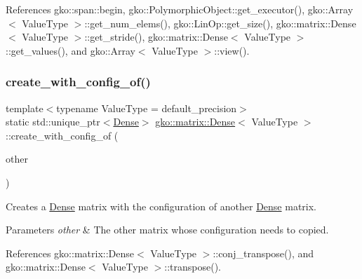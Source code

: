 References gko\+::span\+::begin, gko\+::\+Polymorphic\+Object\+::get\+\_\+executor(), gko\+::\+Array$<$ Value\+Type $>$\+::get\+\_\+num\+\_\+elems(), gko\+::\+Lin\+Op\+::get\+\_\+size(), gko\+::matrix\+::\+Dense$<$ Value\+Type $>$\+::get\+\_\+stride(), gko\+::matrix\+::\+Dense$<$ Value\+Type $>$\+::get\+\_\+values(), and gko\+::\+Array$<$ Value\+Type $>$\+::view().

\mbox{\label{classgko_1_1matrix_1_1Dense_a4c2089b9e1f7a99a32488a4964e832db}} 
\subsubsection{\texorpdfstring{create\+\_\+with\+\_\+config\+\_\+of()}{create\_with\_config\_of()}}
{\footnotesize\ttfamily template$<$typename Value\+Type = default\+\_\+precision$>$ \\
static std\+::unique\+\_\+ptr$<$\hyperlink{classgko_1_1matrix_1_1Dense}{Dense}$>$ \hyperlink{classgko_1_1matrix_1_1Dense}{gko\+::matrix\+::\+Dense}$<$ Value\+Type $>$\+::create\+\_\+with\+\_\+config\+\_\+of (\begin{DoxyParamCaption}\item[{const \hyperlink{classgko_1_1matrix_1_1Dense}{Dense}$<$ Value\+Type $>$ $\ast$}]{other }\end{DoxyParamCaption})\hspace{0.3cm}{\ttfamily [static]}}



Creates a \hyperlink{classgko_1_1matrix_1_1Dense}{Dense} matrix with the configuration of another \hyperlink{classgko_1_1matrix_1_1Dense}{Dense} matrix. 


\begin{DoxyParams}{Parameters}
{\em other} & The other matrix whose configuration needs to copied. \\
\hline
\end{DoxyParams}


References gko\+::matrix\+::\+Dense$<$ Value\+Type $>$\+::conj\+\_\+transpose(), and gko\+::matrix\+::\+Dense$<$ Value\+Type $>$\+::transpose().

\mbox{\label{classgko_1_1matrix_1_1Dense_ab83c739c1b11abaecc3bfd89506f6c9c}} 
